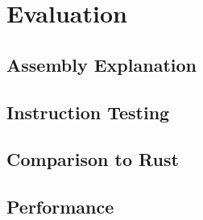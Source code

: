 \chapter{Evaluation}


\section{Assembly Explanation}

\section{Instruction Testing}

\section{Comparison to Rust}

\section{Performance}
